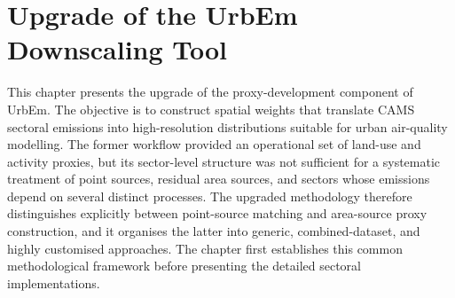 
\chapter{Upgrade of the UrbEm Downscaling Tool}
\label{ch:urbem}

This chapter presents the upgrade of the proxy-development component of
UrbEm. The objective is to construct spatial weights that translate
CAMS sectoral emissions into high-resolution distributions suitable for
urban air-quality modelling. The former workflow provided an operational
set of land-use and activity proxies, but its sector-level structure was
not sufficient for a systematic treatment of point sources, residual
area sources, and sectors whose emissions depend on several distinct
processes. The upgraded methodology therefore distinguishes explicitly
between point-source matching and area-source proxy construction, and it
organises the latter into generic, combined-dataset, and highly
customised approaches. The chapter first establishes this common
methodological framework before presenting the detailed sectoral
implementations.







% 
% 
% 
